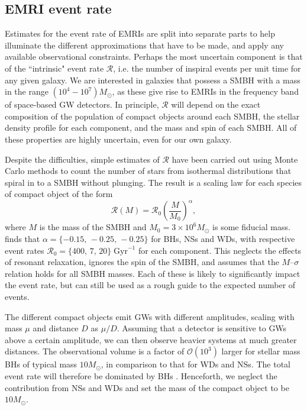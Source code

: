 \subsection{EMRI event rate}
\label{sec:EMRI-event-rate}
Estimates for the event rate of EMRIs are split into separate parts to help illuminate the different approximations that have to be made, and apply any available observational constraints. Perhaps the most uncertain component is that of the ``intrinsic" event rate $\mathcal{R}$, i.e. the number of inspiral events per unit time for any given galaxy. We are interested in galaxies that possess a SMBH with a mass in the range $(10^{4} - 10^7) M_\odot$, as these give rise to EMRIs in the frequency band of space-based GW detectors. In principle, $\mathcal{R}$ will depend on the exact composition of the population of compact objects around each SMBH, the stellar density profile for each component, and the mass and spin of each SMBH. All of these properties are highly uncertain, even for our own galaxy.%

Despite the difficulties, simple estimates of $\mathcal{R}$ have been carried out using Monte Carlo methods to count the number of stars from isothermal distributions that spiral in to a SMBH without plunging. The result is a scaling law for each species of compact object of the form
\begin{equation}
\label{eq:EMRI-intrinsic-rate}
\mathcal{R}(M) = \mathcal{R}_0 \left(\frac{M}{M_0}\right)^\alpha,
\end{equation}
where $M$ is the mass of the SMBH and $M_0 = 3\times 10^6 M_\odot$ is some fiducial mass.  finds that $\alpha = \{-0.15,\,-0.25,\,-0.25\}$ for BHs, NSs and WDs, with respective event rates $\mathcal{R}_0 = \{400,\, 7,\, 20\}\; \mathrm{Gyr}^{-1}$ for each component. This neglects the effects of resonant relaxation, ignores the spin of the SMBH, and assumes that the $M$--$\sigma$ relation holds for all SMBH masses. Each of these is likely to significantly impact the event rate, but  can still be used as a rough guide to the expected number of events.

The different compact objects emit GWs with different amplitudes, scaling with mass $\mu$ and distance $D$ as $\mu/D$. Assuming that a detector is sensitive to GWs above a certain amplitude, we can then observe heavier systems at much greater distances. The observational volume is a factor of $\mathcal{O}(10^3)$ larger for stellar mass BHs of typical mass $10 M_\odot$, in comparison to that for WDs and NSs. The total event rate will therefore be dominated by BHs \citep{gair_event_2004}. Henceforth, we neglect the contribution from NSs and WDs and set the mass of the compact object to be $10 M_\odot$.

